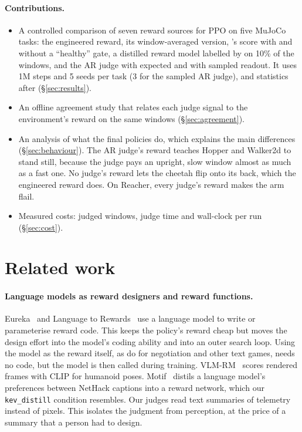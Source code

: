 \paragraph{Contributions.}
\begin{itemize}
\item A controlled comparison of seven reward sources for PPO on five MuJoCo tasks: the engineered reward, its
  window-averaged version, \kev{}'s score with and without a ``healthy'' gate, a distilled reward model labelled by
  \kev{} on 10\% of the windows, and the AR judge with expected and with sampled readout. It uses 1M steps and 5 seeds
  per task (3 for the sampled AR judge), and statistics after \citet{agarwal2021deep} (\S\ref{sec:results}).
\item An offline agreement study that relates each judge signal to the environment's reward on the same windows
  (\S\ref{sec:agreement}).
\item An analysis of what the final policies do, which explains the main differences (\S\ref{sec:behaviour}). The AR
  judge's reward teaches Hopper and Walker2d to stand still, because the judge pays an upright, slow window almost as
  much as a fast one. No judge's reward lets the cheetah flip onto its back, which the engineered reward does. On
  Reacher, every judge's reward makes the arm flail.
\item Measured costs: judged windows, judge time and wall-clock per run (\S\ref{sec:cost}).
\end{itemize}

\section{Related work}\label{sec:related}

\paragraph{Language models as reward designers and reward functions.} Eureka~\cite{ma2024eureka} and Language to
Rewards~\cite{yu2023language} use a language model to write or parameterise reward code. This keeps the policy's reward
cheap but moves the design effort into the model's coding ability and into an outer search loop. Using the model as the
reward itself, as \citet{kwon2023reward} do for negotiation and other text games, needs no code, but the model is then
called during training. VLM-RM~\cite{rocamonde2024vlm} scores rendered frames with CLIP for humanoid poses. Motif~\cite{klissarov2024motif}
distils a language model's preferences between NetHack captions into a reward network, which our \texttt{kev\_distill}
condition resembles. Our judges read text summaries of telemetry instead of pixels. This isolates the judgment from
perception, at the price of a summary that a person had to design.


